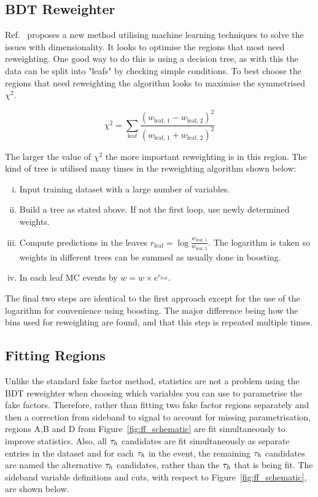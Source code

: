 \subsection{BDT Reweighter}

Ref.~\cite{Rogozhnikov:2016bdp} proposes a new method utilising machine learning techniques to solve the issues with dimensionality. 
It looks to optimise the regions that most need reweighting. 
One good way to do this is using a decision tree, as with this the data can be split into "leafs" by checking simple conditions.
To best choose the regions that need reweighting the algorithm looks to maximise the symmetrised $\chi^2$.

\begin{equation}
\chi^2 = \sum_{\text{leaf}} \frac{(w_{\text{leaf, 1}}-w_{\text{leaf, 2}})^2}{(w_{\text{leaf, 1}}+w_{\text{leaf, 2}})^2}
\end{equation}

The larger the value of $\chi^2$ the more important reweighting is in this region. 
The kind of tree is utilised many times in the reweighting algorithm shown below:

\begin{enumerate}[i)]
\item Input training dataset with a large number of variables.
\item Build a tree as stated above. If not the first loop, use newly determined weights.
\item Compute predictions in the leaves $r_{\text{leaf}} = \log\frac{w_{\text{leaf, 1}}}{w_{\text{leaf, 2}}}$. The logarithm is taken so weights in different trees can be summed as usually done in boosting.
\item In each leaf MC events by $w = w \times e^{r_{\text{leaf}}}$.
\end{enumerate}

The final two steps are identical to the first approach except for the use of the logarithm for convenience using boosting. 
The major difference being how the bins used for reweighting are found, and that this step is repeated multiple times. \\

\subsection{Fitting Regions}

Unlike the standard fake factor method, statistics are not a problem using the BDT reweighter when choosing which variables you can use to parametrise the fake factors. 
Therefore, rather than fitting two fake factor regions separately and then a correction from sideband to signal to account for missing parametrisation, regions A,B and D from Figure~\ref{fig:ff_schematic} are fit simultaneously to improve statistics. 
Also, all $\tau_{h}$ candidates are fit simultaneously as separate entries in the dataset and for each $\tau_{h}$ in the event, the remaining $\tau_{h}$ candidates are named the alternative $\tau_{h}$ candidates, rather than the $\tau_{h}$ that is being fit. 
The sideband variable definitions and cuts, with respect to Figure~\ref{fig:ff_schematic}, are shown below. \\

